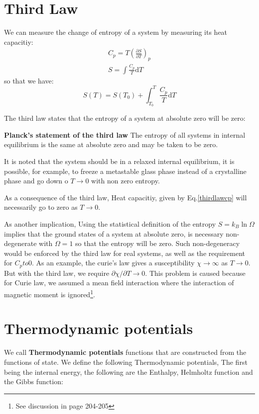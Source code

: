 \documentclass{article}
\newcommand{\pfrac}[2]{\frac{\partial #1}{\partial #2}}
\newcommand{\dnor}{\text{d}}
\begin{document}
\section{Third Law}
We can measure the change of entropy of a system by measuring its heat capacitiy:
\begin{gather}
    C_p = T\left(\pfrac{S}{T}\right)_p \label{thirdlawcp}\\
    S = \int \frac{C_p}{T} \dnor T
\end{gather}
so that we have:
\begin{equation}
    S(T) = S(T_0) + \int_{T_0}^{T} \frac{C_p}{T} \dnor T
\end{equation}

The third law states that the entropy of a system at absolute zero will be zero:

\textbf{Planck's statement of the third law} The entropy of all systems in internal
equilibrium is the same at absolute zero and may be taken to be zero.

It is noted that the system should be in a relaxed internal equilibrium, it is possible,
for example, to freeze a metastable glass phase instead of a crystalline phase and go down
o $T \to 0$ with non zero entropy.

As a consequence of the third law, Heat capacitiy, given by Eq.\ref{thirdlawcp} will
necessarily go to zero as $T\to0$.

As another implication, Using the statistical definition of the entropy $S = k_B \ln \Omega$
implies that the ground states of a system at absolute zero, is necessary non-degenerate with
$\Omega = 1$ so that the entropy will be zero. Such non-degeneracy would be enforced by the 
third law for real systems, as well as the requirement for $C_pto 0$. 
As an example, the curie's law gives a susceptibility $\chi \to \infty$ as $T \to 0$. But with
the third law, we require $\partial \chi / \partial T \to 0$. This problem is caused because
for Curie law, we assumed a mean field interaction where the interaction of magnetic
moment is ignored\footnote{See discussion in page 204-205}. 

\section{Thermodynamic potentials}
We call \textbf{Thermodynamic potentials} functions that are constructed from 
the functions of state. 
We define the following Thermodynamic potentials, The first being the internal 
energy, the following are the Enthalpy, Helmholtz function and the Gibbs 
function:
\end{document}
